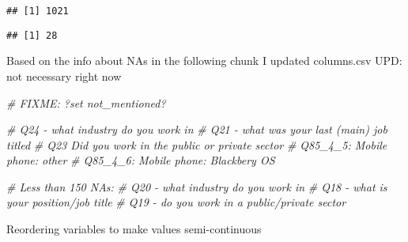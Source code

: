 \documentclass[]{article}
\newenvironment{Shaded}{\begin{snugshade}}{\end{snugshade}}
\newcommand{\DecValTok}[1]{\textcolor[rgb]{0.00,0.00,0.81}{{#1}}}
\newcommand{\StringTok}[1]{\textcolor[rgb]{0.31,0.60,0.02}{{#1}}}
\newcommand{\CommentTok}[1]{\textcolor[rgb]{0.56,0.35,0.01}{\textit{{#1}}}}
\newcommand{\NormalTok}[1]{{#1}}
\begin{document}
\begin{verbatim}
## [1] 1021
\end{verbatim}

\begin{Shaded}
\end{Shaded}

\begin{verbatim}
## [1] 28
\end{verbatim}

Based on the info about NAs in the following chunk I updated columns.csv
UPD: not necessary right now

\begin{Shaded}
\begin{Highlighting}[]
\CommentTok{# FIXME: ?set not_mentioned?}

\CommentTok{# Q24 - what industry do you work in}
\CommentTok{# Q21 - what was your last (main) job titled}
\CommentTok{# Q23 Did you work in the public or private sector}
\CommentTok{# Q85_4_5: Mobile phone: other}
\CommentTok{# Q85_4_6: Mobile phone: Blackbery OS}

\CommentTok{# Less than 150 NAs:}
\CommentTok{# Q20 - what industry do you work in}
\CommentTok{# Q18 - what is your position/job title}
\CommentTok{# Q19 - do you work in a public/private sector}
\end{Highlighting}
\end{Shaded}

Reordering variables to make values semi-continuous

\begin{Shaded}
\end{Shaded}
\end{document}
